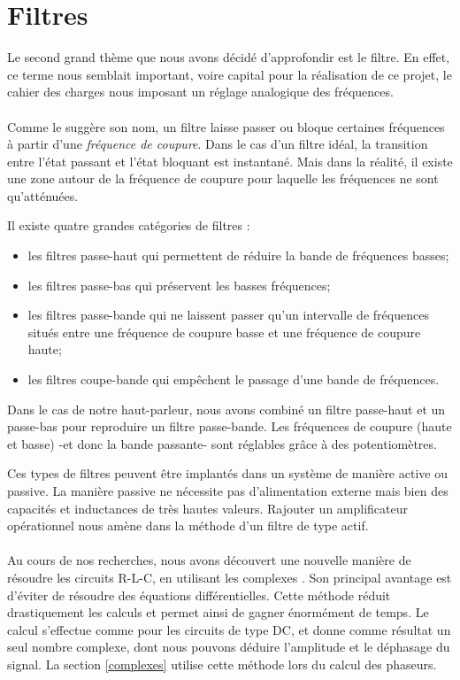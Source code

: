 \section{Filtres}
Le second grand thème que nous avons décidé d'approfondir est le filtre. En effet, ce terme nous semblait 
important, voire capital pour la réalisation de ce projet, le cahier des charges nous imposant un réglage 
analogique des fréquences.

\paragraph{}
Comme le suggère son nom, un filtre laisse passer ou bloque certaines fréquences à partir d'une \emph{fréquence de coupure}. Dans le cas d'un filtre idéal, la transition entre l'état passant et l'état bloquant est instantané. Mais dans la réalité, il existe une zone autour de la fréquence de coupure pour laquelle les fréquences ne sont qu'atténuées. 

Il existe quatre grandes catégories de filtres \cite{Kularatna} : 
\begin{itemize}
\item les filtres passe-haut qui permettent de réduire la bande de fréquences basses;
\item les filtres passe-bas qui préservent les basses fréquences;
\item les filtres passe-bande qui ne laissent passer qu'un intervalle de fréquences situés entre une fréquence de coupure basse et une fréquence de coupure haute;
\item les filtres coupe-bande qui empêchent le passage d'une bande de fréquences.
\end{itemize}
Dans le cas de notre haut-parleur, nous avons combiné un filtre passe-haut et un passe-bas pour reproduire un filtre passe-bande. Les fréquences de coupure (haute et basse) -et donc la bande passante- sont réglables grâce à des potentiomètres.

Ces types de filtres peuvent être implantés dans un système de manière active ou passive. La manière passive ne nécessite pas d'alimentation externe mais bien des 
capacités et inductances de très hautes valeurs. Rajouter un amplificateur opérationnel nous amène dans la méthode d'un filtre de type actif. \cite{Kularatna}

\paragraph{}
Au cours de nos recherches, nous avons découvert une nouvelle manière de résoudre les circuits R-L-C, en utilisant les 
complexes \cite{Irwin}. Son principal avantage est d'éviter de résoudre des équations différentielles. Cette méthode réduit drastiquement les calculs et permet ainsi de gagner énormément de temps. Le calcul s'effectue comme pour les circuits de type DC, et donne comme résultat un seul nombre complexe, dont nous pouvons déduire l'amplitude et le déphasage du signal.
La section \ref{complexes} utilise cette méthode lors du calcul des phaseurs. 
